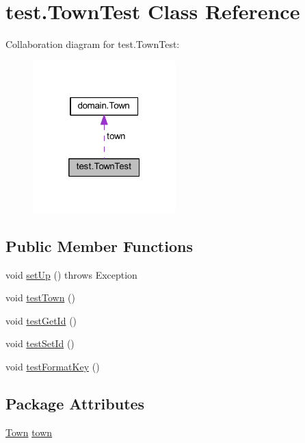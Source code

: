 \hypertarget{classtest_1_1_town_test}{}\section{test.\+Town\+Test Class Reference}
\label{classtest_1_1_town_test}


Collaboration diagram for test.\+Town\+Test\+:\nopagebreak
\begin{figure}[H]
\begin{center}
\leavevmode
\includegraphics[width=157pt]{classtest_1_1_town_test__coll__graph}
\end{center}
\end{figure}
\subsection*{Public Member Functions}
\begin{DoxyCompactItemize}
\item 
void \hyperlink{classtest_1_1_town_test_a9818b619a3ef6d7d7c03f19d48456eaf}{set\+Up} ()  throws Exception 
\item 
void \hyperlink{classtest_1_1_town_test_a7cededa2b2d7c866897875e8b29f6c0d}{test\+Town} ()
\item 
void \hyperlink{classtest_1_1_town_test_afb0700534b21a2cab187cf97aee0915b}{test\+Get\+Id} ()
\item 
void \hyperlink{classtest_1_1_town_test_a9c9b33be480e6929f77a8402a72825ff}{test\+Set\+Id} ()
\item 
void \hyperlink{classtest_1_1_town_test_aafaac696506ffac04363befb43bf7b23}{test\+Format\+Key} ()
\end{DoxyCompactItemize}
\subsection*{Package Attributes}
\begin{DoxyCompactItemize}
\item 
\hyperlink{classdomain_1_1_town}{Town} \hyperlink{classtest_1_1_town_test_a413a6f4701d56787ee29731259bbd26a}{town}
\end{DoxyCompactItemize}


